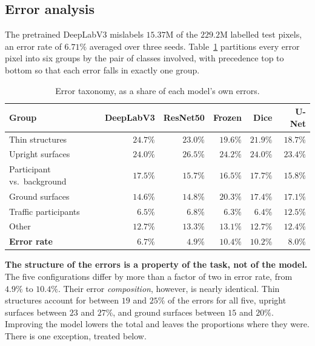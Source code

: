 \subsection{Error analysis}
\label{subsec:results-5}

The pretrained DeepLabV3 mislabels $15.37$M of the $229.2$M labelled test pixels, an error rate
of $6.71\%$ averaged over three seeds. Table~\ref{tab:errors} partitions every error pixel into
six groups by the pair of classes involved, with precedence top to bottom so that each error
falls in exactly one group.

\begin{table}[H]
\centering
\caption{Error taxonomy, as a share of each model's own errors.}
\label{tab:errors}
\small
\begin{tabular}{lrrrrr}
\hline
\textbf{Group} & \textbf{DeepLabV3} & \textbf{ResNet50} & \textbf{Frozen} & \textbf{Dice} & \textbf{U-Net} \\
\hline
Thin structures            & $24.7\%$ & $23.0\%$ & $19.6\%$ & $21.9\%$ & $18.7\%$ \\
Upright surfaces           & $24.0\%$ & $26.5\%$ & $24.2\%$ & $24.0\%$ & $23.4\%$ \\
Participant vs.\ background& $17.5\%$ & $15.7\%$ & $16.5\%$ & $17.7\%$ & $15.8\%$ \\
Ground surfaces            & $14.6\%$ & $14.8\%$ & $20.3\%$ & $17.4\%$ & $17.1\%$ \\
Traffic participants       & $ 6.5\%$ & $ 6.8\%$ & $ 6.3\%$ & $ 6.4\%$ & $12.5\%$ \\
Other                      & $12.7\%$ & $13.3\%$ & $13.1\%$ & $12.7\%$ & $12.4\%$ \\
\hline
\textbf{Error rate}        & $ 6.7\%$ & $ 4.9\%$ & $10.4\%$ & $10.2\%$ & $ 8.0\%$ \\
\hline
\end{tabular}
\end{table}

\textbf{The structure of the errors is a property of the task, not of the model.} The five
configurations differ by more than a factor of two in error rate, from $4.9\%$ to $10.4\%$.
Their error \emph{composition}, however, is nearly identical. Thin structures account for
between $19$ and $25\%$ of the errors for all five, upright surfaces between $23$ and $27\%$,
and ground surfaces between $15$ and $20\%$. Improving the model lowers the total and
leaves the proportions where they were. There is one exception, treated below.

